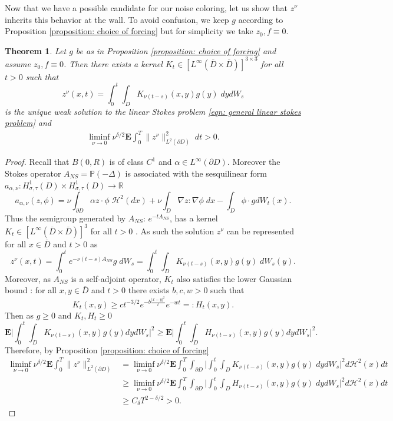 \documentclass[11pt, reqno]{article}
\def\R{{\mathbb R}} %
\newtheorem{theorem}{Theorem}[section]
\def\grad{\nabla}
\def\E{\mathbf{E}}
\def\P{{\mathbb P}}
\def\H{{\mathcal H}}
\begin{document}
Now that we have a possible candidate for our noise coloring, let us show that $z^\nu$ inherits this behavior at the wall. To avoid confusion, we keep $g$ according to Proposition \ref{proposition: choice of forcing} but for simplicity we take $z_0, f \equiv 0$. 
\begin{theorem}\label{thm: exist blow up along boundary}
    Let $g$ be as in Proposition \ref{proposition: choice of forcing} and assume $z_0, f \equiv 0$. Then there exists a kernel $K_t\in [L^\infty(\overline{D} \times \overline{D})]^{3 \times 3}$ for all $t > 0$ such that
    \[
        z^\nu(x,t) = \int_0^t\int_D K_{\nu(t-s)}(x,y)g(y)\;dydW_s
    \]
    is the unique weak solution to the linear Stokes problem  \eqref{eqn: general linear stokes problem} and 
    \begin{align*}
        \liminf_{\nu \to 0} \nu^{\delta/2}\E\int_0^T\|z^\nu\|_{L^2(\partial D)}^2\;dt > 0.
    \end{align*}
\end{theorem}
\begin{proof}
    Recall that $B(0,R)$ is of class $C^1$ and $\alpha \in L^\infty(\partial D)$. Moreover the Stokes operator $A_{NS} = \P(-\Delta)$ is associated with the sesquilinear form $a_{\alpha, \nu}: H_{\sigma, \tau}^1(D) \times H_{\sigma, \tau}^1(D) \to \R$ 
    \[
        a_{\alpha, \nu}(z, \phi) = \nu \int_{\partial D} \alpha z \cdot \phi \;\H^2(dx) + \nu \int_{D}\grad z:\grad \phi\;dx - \int_D \phi \cdot gdW_t(x).
    \]
    Thus the semigroup generated by $A_{NS}$: $e^{-tA_{NS}}$, has a kernel $K_t \in [L^\infty(\overline{D} \times \overline{D})]^3$ for all $t > 0$ \cite{ter2020holder}. As such the solution $z^\nu$ can be represented for all $x \in \overline{D}$ and $t > 0$ as
    \[
         z^\nu(x,t) = \int_0^t e^{-\nu(t-s)A_{NS}}g\;dW_s = \int_0^t\int_D K_{\nu(t-s)}(x,y)g(y)\;dW_s(y).
    \]
    Moreover, as $A_{NS}$ is a self-adjoint operator, $K_t$ also satisfies the lower Gaussian bound \cite{ter2020holder}: for all $x,y \in \overline{D}$ and $t > 0$ there exists $b, c, w > 0$ such that 
    \[
        K_t(x,y) \geq ct^{-3/2}e^{-b\frac{|x-y|^2}{t}}e^{-wt} =: H_t(x,y).
    \]
    Then as $g \geq 0$ and $K_t, H_t \geq 0$ 
    \[
        \E\Big|\int_0^t\int_D K_{\nu(t-s)}(x,y)g(y)dydW_s\Big|^2 \geq \E\Big|\int_0^t\int_D H_{\nu(t-s)}(x,y)g(y)dydW_s\Big|^2.
    \]
    Therefore, by Proposition \ref{proposition: choice of forcing}
    \begin{align*}
        \liminf_{\nu \to 0}\nu^{\delta/2}\E\int_0^T\|z^\nu\|_{L^2(\partial D)}^2
        &= \liminf_{\nu \to 0}\nu^{\delta/2} \E\int_0^T\int_{\partial D}\Big|\int_0^t\int_D K_{\nu (t-s)}(x,y)g(y)\;dydW_s\Big|^2d\H^2(x)dt\\
        &\geq \liminf_{\nu \to 0}\nu^{\delta/2}\E\int_0^T\int_{\partial D}\Big|\int_0^t\int_D H_{\nu(t-s)}(x,y)g(y)\;dydW_s\Big|^2d\H^2(x)dt\\
        &\geq C_\delta T^{2-\delta/2} > 0.
    \end{align*}
\end{proof}
\end{document}
